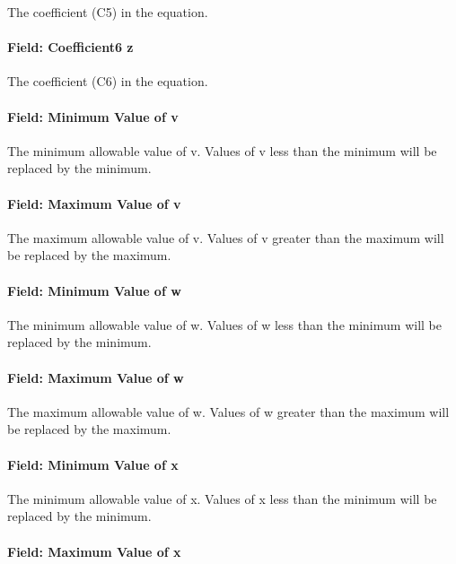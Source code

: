 The coefficient (C5) in the equation.

\paragraph{Field: Coefficient6 z}\label{field-coefficient6-z}

The coefficient (C6) in the equation.

\paragraph{Field: Minimum Value of v}\label{field-minimum-value-of-v}

The minimum allowable value of v. Values of v less than the minimum will be replaced by the minimum.

\paragraph{Field: Maximum Value of v}\label{field-maximum-value-of-v}

The maximum allowable value of v. Values of v greater than the maximum will be replaced by the maximum.

\paragraph{Field: Minimum Value of w}\label{field-minimum-value-of-w-1}

The minimum allowable value of w. Values of w less than the minimum will be replaced by the minimum.

\paragraph{Field: Maximum Value of w}\label{field-maximum-value-of-w-1}

The maximum allowable value of w. Values of w greater than the maximum will be replaced by the maximum.

\paragraph{Field: Minimum Value of x}\label{field-minimum-value-of-x-18}

The minimum allowable value of x. Values of x less than the minimum will be replaced by the minimum.

\paragraph{Field: Maximum Value of x}\label{field-maximum-value-of-x-19}

